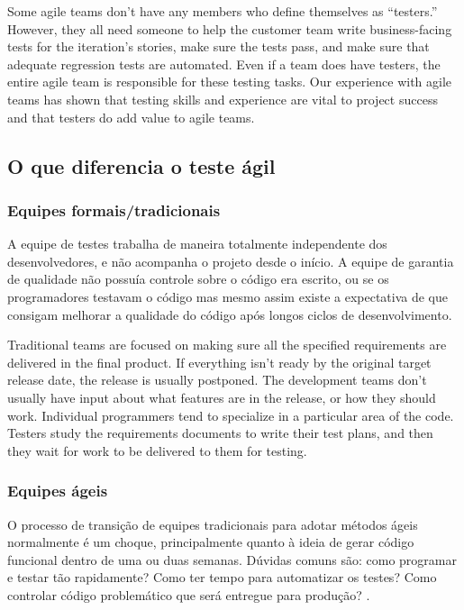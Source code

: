 \documentclass[
	12pt,				%
	openright,			%
	oneside,			%
	a4paper,			%
	english,			%
	brazil,				%
	]{abntex2}
\begin{document}
Some agile teams don’t have any members who define themselves as “testers.” However, they all need someone to help the customer team write business-facing tests for the iteration’s stories, make sure the tests pass, and make sure that adequate regression tests are automated. Even if a team does have testers, the entire agile team is responsible for these testing tasks. Our experience with agile teams has shown that testing skills and experience are vital to project success and that testers do add value to agile teams.

\subsection{O que diferencia o teste ágil}

\subsubsection{Equipes formais/tradicionais}
A equipe de testes trabalha de maneira totalmente independente dos desenvolvedores, e não acompanha o projeto desde o início. A equipe de garantia de qualidade não possuía controle sobre o código era escrito, ou se os programadores testavam o código mas mesmo assim existe a expectativa de que consigam melhorar a qualidade do código após longos ciclos de desenvolvimento.

Traditional teams are focused on making sure all the specified requirements are delivered in the final product. If everything isn’t ready by the original target release date, the release is usually postponed. The development teams don’t usually have input about what features are in the release, or how they should work. Individual programmers tend to specialize in a particular area of the code. Testers study the requirements documents to write their test plans, and then they wait for work to be delivered to them for testing.

\subsubsection{Equipes ágeis}
O processo de transição de equipes tradicionais para adotar métodos ágeis normalmente é um choque, principalmente quanto à ideia de gerar código funcional dentro de uma ou duas semanas. Dúvidas comuns são: como programar e testar tão rapidamente? Como ter tempo para automatizar os testes? Como controlar código problemático que será entregue para produção? \cite{crispin2009}.
\end{document}
